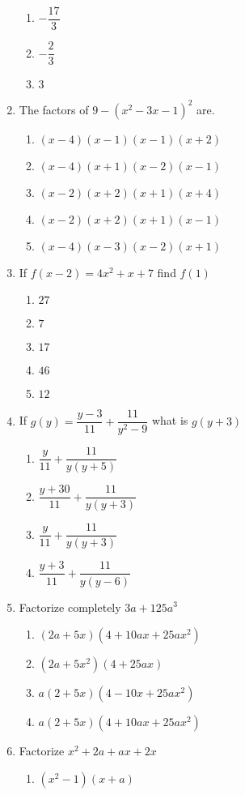 \begin{multicols}{2}
\begin{enumerate}[label={\arabic*.}]
\begin{enumerate}[label={\Alph*.}]
	\item \(-\dfrac{17}{3}\)
	\item \(-\dfrac{2}{3}\)
	\item \(3\)
	\end{enumerate}
\item The factors of \(9-(x^2-3x-1)^2\) are. 
	\begin{enumerate}[label={\Alph*.}]
	\item \((x-4)(x-1)(x-1)(x+2)\)
	\item \((x-4)(x+1)(x-2)(x-1)\)
	\item \((x-2)(x+2)(x+1)(x+4)\)
	\item \((x-2)(x+2)(x+1)(x-1)\)
	\item \((x-4)(x-3)(x-2)(x+1)\)
	\end{enumerate}
\item If \(f(x-2) = 4x^2 + x + 7 \) find \(f(1)\)
	\begin{enumerate}[label={\Alph*.}]
	\item \(27\)
	\item \(7\)
	\item \(17\)
	\item \(46\)
	\item \(12\)
	\end{enumerate}
\item If \(g(y) = \dfrac{y - 3}{11} + \dfrac{11}{y^2-9}\) what is \(g(y+3)\)
	\begin{enumerate}[label={\Alph*.}]
	\item \(\dfrac{y}{11} + \dfrac{11}{y(y+5)}\)
	\item \(\dfrac{y+30}{11} + \dfrac{11}{y(y+3)}\)
	\item \(\dfrac{y}{11} + \dfrac{11}{y(y+3)}\)
	\item \(\dfrac{y+3}{11}+\dfrac{11}{y(y-6)}\)
	\end{enumerate}
\item Factorize completely \(3a+125a^3\)
	\begin{enumerate}[label={\Alph*.}]
	\item \((2a+5x)(4+10ax + 25ax^2)\)
	\item \((2a+5x^2)(4+25ax)\)
	\item \(a(2+5x)(4-10x+25ax^2)\)
	\item \(a(2+5x)(4+10ax+25ax^2)\)
	\end{enumerate}
\item Factorize \(x^2+2a+ax+2x\)
	\begin{enumerate}[label={\Alph*.}]
	\item \((x^2-1)(x+a)\)

\end{enumerate}
\end{enumerate}
\end{multicols}
